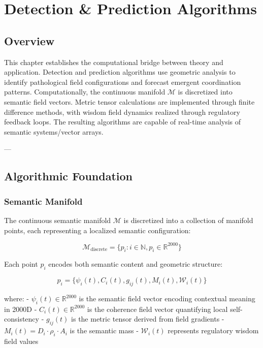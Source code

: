 \chapter{Detection & Prediction Algorithms}

\section{Overview}

This chapter establishes the computational bridge between theory and application. Detection and prediction algorithms use geometric analysis to identify pathological field configurations and forecast emergent coordination patterns. Computationally, the continuous manifold $\mathcal{M}$ is discretized into semantic field vectors. Metric tensor calculations are implemented through finite difference methods, with wisdom field dynamics realized through regulatory feedback loops. The resulting algorithms are capable of real-time analysis of semantic systems/vector arrays.

---

\section{Algorithmic Foundation}

\subsection{Semantic Manifold}

The continuous semantic manifold $\mathcal{M}$ is discretized into a collection of manifold points, each representing a localized semantic configuration:

\begin{equation}
\mathcal{M}_{\text{discrete}} = \{p_i : i \in \mathbb{N}, p_i \in \mathbb{R}^{2000}\}
\end{equation}

Each point $p_i$ encodes both semantic content and geometric structure:

\begin{equation}
p_i = \{\psi_i(t), C_i(t), g_{ij}(t), M_i(t), \mathcal{W}_i(t)\}
\end{equation}

where:
- $\psi_i(t) \in \mathbb{R}^{2000}$ is the semantic field vector encoding contextual meaning in 2000D
- $C_i(t) \in \mathbb{R}^{2000}$ is the coherence field vector quantifying local self-consistency  
- $g_{ij}(t)$ is the metric tensor derived from field gradients
- $M_i(t) = D_i \cdot \rho_i \cdot A_i$ is the semantic mass
- $\mathcal{W}_i(t)$ represents regulatory wisdom field values

